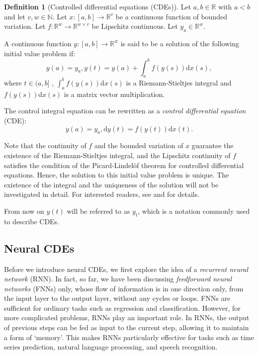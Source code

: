 \documentclass[a4paper,11pt,titlepage]{article}
\theoremstyle{definition}
\newtheorem{definition}{Definition}[section]
\theoremstyle{plain}
\theoremstyle{remark}
\begin{document}
\begin{definition}[Controlled differential equations (CDEs)]
    Let $a,b\in\mathbb{R}$ with $a<b$ and let $v,w\in\mathbb{N}$. Let $x:[a,b]\rightarrow\mathbb{R}^v$ be a continuous function of bounded variation. Let $f:\mathbb{R}^w\rightarrow\mathbb{R}^{w\times v}$ be Lipschitz continuous. Let $y_a\in\mathbb{R}^w$.
    
    A continuous function $y:[a,b]\rightarrow\mathbb{R}^w$ is said to be a solution of the following initial value problem if:
    $$y(a)=y_a, y(t)=y(a)+\int_a^bf(y(s))\mathrm{d}x(s),$$
    where $t\in(a,b]$ \cite{kidger2022neural}, $\int_a^bf(y(s))\mathrm{d}x(s)$ is a Riemann-Stieltjes integral and $f(y(s))\mathrm{d}x(s)$ is a matrix vector multiplication.

    The control integral equation can be rewritten as a \textit{control differential equation} (CDE):
    $$y(a)=y_a, \mathrm{d}y(t) = f(y(t))\mathrm{d}x(t).$$
    \end{definition}

Note that the continuity of $f$ and the bounded variation of $x$ guarantee the existence of the Riemann-Stieltjes integral, and the Lipschitz continuity of $f$ satisfies the condition of the Picard-Lindelöf theorem for controlled differential equations. Hence, the solution to this initial value problem is unique. The existence of the integral and the uniqueness of the solution will not be investigated in detail. For interested readers, see \cite{kidger2022neural} and \cite{rudin1953} for details.

From now on $y(t)$ will be referred to as $y_t$, which is a notation commonly used to describe CDEs.

\subsection{Neural CDEs}

Before we introduce neural CDEs, we first explore the idea of a \textit{recurrent neural network} (RNN). In fact, so far, we have been discussing \textit{feedforward neural networks} (FNNs) only, whose flow of information is in one direction only, from the input layer to the output layer, without any cycles or loops. FNNs are sufficient for ordinary tasks such as regression and classification. However, for more complicated problems, RNNs play an important role. In RNNs, the output of previous steps can be fed as input to the current step, allowing it to maintain a form of ‘memory’. This makes RNNs particularly effective for tasks such as time series prediction, natural language processing, and speech recognition.
\end{document}
